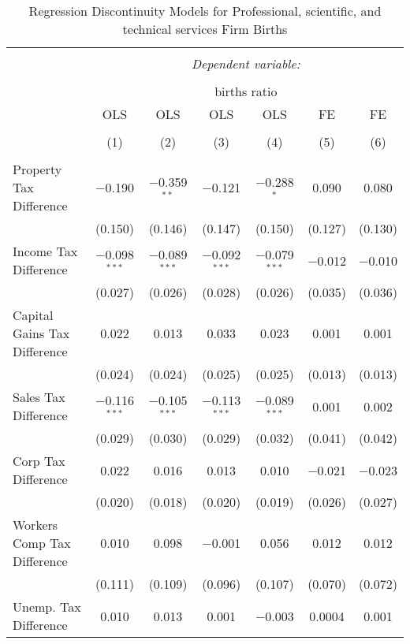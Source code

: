 
\begin{table}[!htbp] \centering 
  \caption{Regression Discontinuity Models for  Professional, scientific, and technical services Firm Births} 
  \label{54rd} 
\footnotesize 
\begin{tabular}{@{\extracolsep{5pt}}lcccccc} 
\\[-1.8ex]\hline 
\hline \\[-1.8ex] 
 & \multicolumn{6}{c}{\textit{Dependent variable:}} \\ 
\cline{2-7} 
\\[-1.8ex] & \multicolumn{6}{c}{births ratio} \\ 
 & OLS & OLS & OLS & OLS & FE & FE \\ 
\\[-1.8ex] & (1) & (2) & (3) & (4) & (5) & (6)\\ 
\hline \\[-1.8ex] 
 Property Tax Difference & $-$0.190 & $-$0.359$^{**}$ & $-$0.121 & $-$0.288$^{*}$ & 0.090 & 0.080 \\ 
  & (0.150) & (0.146) & (0.147) & (0.150) & (0.127) & (0.130) \\ 
  Income Tax Difference & $-$0.098$^{***}$ & $-$0.089$^{***}$ & $-$0.092$^{***}$ & $-$0.079$^{***}$ & $-$0.012 & $-$0.010 \\ 
  & (0.027) & (0.026) & (0.028) & (0.026) & (0.035) & (0.036) \\ 
  Capital Gains Tax Difference & 0.022 & 0.013 & 0.033 & 0.023 & 0.001 & 0.001 \\ 
  & (0.024) & (0.024) & (0.025) & (0.025) & (0.013) & (0.013) \\ 
  Sales Tax Difference & $-$0.116$^{***}$ & $-$0.105$^{***}$ & $-$0.113$^{***}$ & $-$0.089$^{***}$ & 0.001 & 0.002 \\ 
  & (0.029) & (0.030) & (0.029) & (0.032) & (0.041) & (0.042) \\ 
  Corp Tax Difference & 0.022 & 0.016 & 0.013 & 0.010 & $-$0.021 & $-$0.023 \\ 
  & (0.020) & (0.018) & (0.020) & (0.019) & (0.026) & (0.027) \\ 
  Workers Comp Tax Difference & 0.010 & 0.098 & $-$0.001 & 0.056 & 0.012 & 0.012 \\ 
  & (0.111) & (0.109) & (0.096) & (0.107) & (0.070) & (0.072) \\ 
  Unemp. Tax Difference & 0.010 & 0.013 & 0.001 & $-$0.003 & 0.0004 & 0.001 \\ 

\end{tabular}
\end{table}
